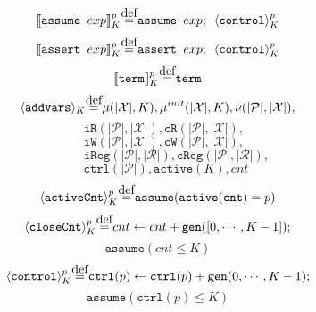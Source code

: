 \documentclass{article}
\newcommand{\var}{\texttt}
\newcommand\myeq{\stackrel{\mathclap{\normalfont\mbox{def}}}{=}}
\begin{document}
$$\llbracket \texttt{assume } exp \rrbracket_K^p \myeq \texttt{assume } exp ; \kern 0.5em \langle \texttt{control} \rangle_K^p$$
\vspace{-1.2em}
$$\llbracket \texttt{assert } exp \rrbracket_K^p \myeq \texttt{assert } exp ; \kern 0.5em \langle \texttt{control} \rangle_K^p$$
\vspace{-1.2em}
$$\llbracket\texttt{term}\rrbracket_K^p \myeq \texttt{term}$$
\vspace{-1.2em}
$$\langle \var{addvars} \rangle_K \myeq \mu(|\mathcal{X}|,K), \mu^{init}(|\mathcal{X}|,K), \nu(|\mathcal{P}|,|\mathcal{X}|),$$
$$ \quad\var{iR}(|\mathcal{P}|,|\mathcal{X}|), \var{cR}(|\mathcal{P}|,|\mathcal{X}|),$$
$$ \quad\var{iW}(|\mathcal{P}|,|\mathcal{X}|), \var{cW}(|\mathcal{P}|,|\mathcal{X}|),$$
$$ \qquad\quad\var{iReg}(|\mathcal{P}|,|\mathcal{R}|), \var{cReg}(|\mathcal{P}|,|\mathcal{R}|),$$
$$ \quad\;\var{ctrl}(|\mathcal{P}|), \var{active}(K), cnt$$
\vspace{-1.2em}
$$\langle \texttt{activeCnt} \rangle_K^p \myeq \texttt{assume}(\texttt{active}(\texttt{cnt}) = p)$$
\vspace{-1.2em}
$$\langle \texttt{closeCnt} \rangle_K^p \myeq cnt \leftarrow cnt + \texttt{gen}([0,\cdots,K-1]);$$
\vspace{-1.7em}
$$ \texttt{assume}(cnt \leq K)$$
\vspace{-1.2em}
$$ \langle \texttt{control} \rangle_K^p \myeq \texttt{ctrl}(p) \leftarrow \texttt{ctrl}(p) + \texttt{gen}(0,\cdots,K-1);$$
\vspace{-1.7em}
$$ \texttt{assume}(\texttt{ctrl}(p) \leq K)$$
\end{document}
